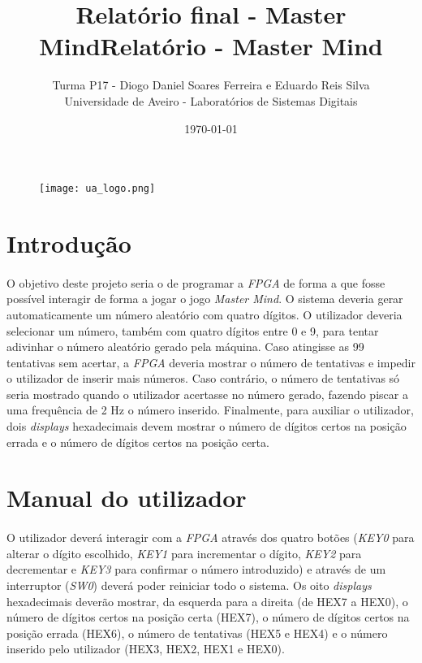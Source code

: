 \documentclass[11pt,openany,twoside]{report}
\title{\textbf{Relatório final - Master Mind}}
\begin{document}
\begin{titlepage}
\begin{figure}
\title{\textbf{Relatório - Master Mind}}
\author{Turma P17 - Diogo Daniel Soares Ferreira e Eduardo Reis Silva\\\vspace{3cm}
Universidade de Aveiro - Laboratórios de Sistemas Digitais}
\date{\today}
 \texttt{[image: ua\_logo.png]}
\end{figure}
\end{titlepage}
\renewcommand\thesection{}

\maketitle
\tableofcontents


\section{Introdução}

\paragraph{ } O objetivo deste projeto seria o de programar a \textit{FPGA} de forma a que fosse possível interagir de forma a jogar o jogo \textit{Master Mind}. O sistema deveria gerar automaticamente um número aleatório com quatro dígitos. O utilizador deveria selecionar um número, também com quatro dígitos entre 0 e 9, para tentar adivinhar o número aleatório gerado pela máquina. Caso atingisse as 99 tentativas sem acertar, a \textit{FPGA} deveria mostrar o número de tentativas e impedir o utilizador de inserir mais números. Caso contrário, o número de tentativas só seria mostrado quando o utilizador acertasse no número gerado, fazendo piscar a uma frequência de 2 Hz o número inserido. Finalmente, para auxiliar o utilizador, dois \textit{displays} hexadecimais devem mostrar o número de dígitos certos na posição errada e o número de dígitos certos na posição certa.


\section{Manual do utilizador}

\paragraph{ } O utilizador deverá interagir com a \textit{FPGA} através dos quatro botões (\textit{KEY0} para alterar o dígito escolhido, \textit{KEY1} para incrementar o dígito, \textit{KEY2} para decrementar e \textit{KEY3} para confirmar o número introduzido) e através de um interruptor (\textit{SW0}) deverá poder reiniciar todo o sistema. Os oito \textit{displays} hexadecimais deverão mostrar, da esquerda para a direita (de HEX7 a HEX0), o número de dígitos certos na posição certa (HEX7), o número de dígitos certos na posição errada (HEX6), o número de tentativas (HEX5 e HEX4) e o número inserido pelo utilizador (HEX3, HEX2, HEX1 e HEX0).
\end{document}
